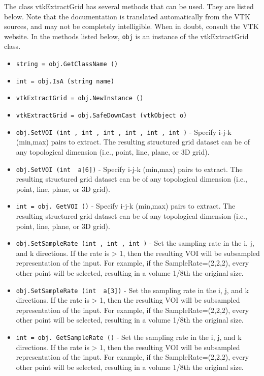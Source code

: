 The class vtkExtractGrid has several methods that can be used.
  They are listed below.
Note that the documentation is translated automatically from the VTK sources,
and may not be completely intelligible.  When in doubt, consult the VTK website.
In the methods listed below, \verb|obj| is an instance of the vtkExtractGrid class.
\begin{itemize}
\item  \verb|string = obj.GetClassName ()|

\item  \verb|int = obj.IsA (string name)|

\item  \verb|vtkExtractGrid = obj.NewInstance ()|

\item  \verb|vtkExtractGrid = obj.SafeDownCast (vtkObject o)|

\item  \verb|obj.SetVOI (int , int , int , int , int , int )| -  Specify i-j-k (min,max) pairs to extract. The resulting structured grid
 dataset can be of any topological dimension (i.e., point, line, plane,
 or 3D grid). 

\item  \verb|obj.SetVOI (int  a[6])| -  Specify i-j-k (min,max) pairs to extract. The resulting structured grid
 dataset can be of any topological dimension (i.e., point, line, plane,
 or 3D grid). 

\item  \verb|int = obj. GetVOI ()| -  Specify i-j-k (min,max) pairs to extract. The resulting structured grid
 dataset can be of any topological dimension (i.e., point, line, plane,
 or 3D grid). 

\item  \verb|obj.SetSampleRate (int , int , int )| -  Set the sampling rate in the i, j, and k directions. If the rate is > 1,
 then the resulting VOI will be subsampled representation of the input.
 For example, if the SampleRate=(2,2,2), every other point will be
 selected, resulting in a volume 1/8th the original size.

\item  \verb|obj.SetSampleRate (int  a[3])| -  Set the sampling rate in the i, j, and k directions. If the rate is > 1,
 then the resulting VOI will be subsampled representation of the input.
 For example, if the SampleRate=(2,2,2), every other point will be
 selected, resulting in a volume 1/8th the original size.

\item  \verb|int = obj. GetSampleRate ()| -  Set the sampling rate in the i, j, and k directions. If the rate is > 1,
 then the resulting VOI will be subsampled representation of the input.
 For example, if the SampleRate=(2,2,2), every other point will be
 selected, resulting in a volume 1/8th the original size.


\end{itemize}

